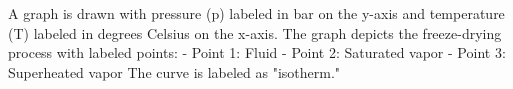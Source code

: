 A graph is drawn with pressure (p) labeled in bar on the y-axis and temperature (T) labeled in degrees Celsius on the x-axis. The graph depicts the freeze-drying process with labeled points:  
- Point 1: Fluid  
- Point 2: Saturated vapor  
- Point 3: Superheated vapor  
The curve is labeled as "isotherm."